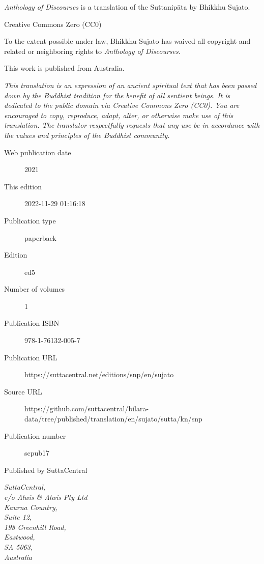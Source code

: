\documentclass[12pt,openany]{book}%
\begin{document}
\begin{footnotesize}

\textit{Anthology of Discourses} is a translation of the Suttanipāta by Bhikkhu Sujato.

\medskip

Creative Commons Zero (CC0)

To the extent possible under law, Bhikkhu Sujato has waived all copyright and related or neighboring rights to \textit{Anthology of Discourses}.

\medskip

This work is published from Australia.

\begin{center}
\textit{This translation is an expression of an ancient spiritual text that has been passed down by the Buddhist tradition for the benefit of all sentient beings. It is dedicated to the public domain via Creative Commons Zero (CC0). You are encouraged to copy, reproduce, adapt, alter, or otherwise make use of this translation. The translator respectfully requests that any use be in accordance with the values and principles of the Buddhist community.}
\end{center}

\medskip

\begin{description}
    \item[Web publication date] 2021
    \item[This edition] 2022-11-29 01:16:18
    \item[Publication type] paperback
    \item[Edition] ed5
    \item[Number of volumes] 1
    \item[Publication ISBN] 978-1-76132-005-7
    \item[Publication URL] https://suttacentral.net/editions/snp/en/sujato
    \item[Source URL] https://github.com/suttacentral/bilara-data/tree/published/translation/en/sujato/sutta/kn/snp
    \item[Publication number] scpub17
\end{description}

\medskip

Published by SuttaCentral

\medskip

\textit{SuttaCentral,\\
c/o Alwis \& Alwis Pty Ltd\\
Kaurna Country,\\
Suite 12,\\
198 Greenhill Road,\\
Eastwood,\\
SA 5063,\\
Australia}

\end{footnotesize}
\end{document}
